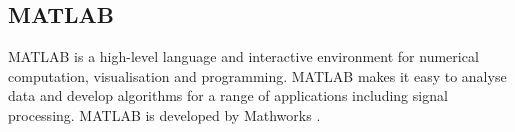 \subsection{MATLAB}
\label{sec:matlab}
MATLAB is a high-level language and interactive environment for numerical computation, visualisation and programming. MATLAB makes it easy to analyse data and develop algorithms for a range of applications including signal processing. MATLAB is developed by Mathworks \cite{matlab}.